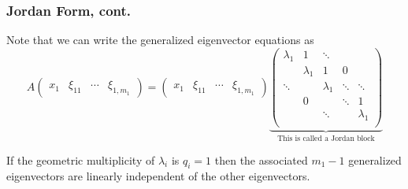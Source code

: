 \documentclass{beamer}
\begin{document}
\begin{frame}\frametitle{Jordan Form, cont.}
	Note that we can write the generalized eigenvector equations as
	{\footnotesize
	\[ 
		A \begin{pmatrix}
	    	x_1 & \xi_{11} & \cdots & \xi_{1,m_1}
	  	  \end{pmatrix}
		= 
			\begin{pmatrix}
	    		x_1 & \xi_{11} & \cdots & \xi_{1,m_1}
	  		\end{pmatrix}
	  		\underbrace{
				\begin{pmatrix}
	    			\lambda_1 & 1 & \ddots \\
	    			& \lambda_1 & 1 & 0\\
	    			\ddots & & \lambda_1 & \ddots & \ddots \\
	    			& 0 & & \ddots & 1\\
	    			& & \ddots & & \lambda_1\\
	  			\end{pmatrix}
	  		}_{\text{This is called a Jordan block}}
	\]
	}

	\begin{lemma}
		If the geometric multiplicity of $\lambda_i$ is $q_i = 1$ then the associated $m_1-1$ generalized 	eigenvectors are linearly independent of the other eigenvectors.
	\end{lemma}
\end{frame}
\end{document}
